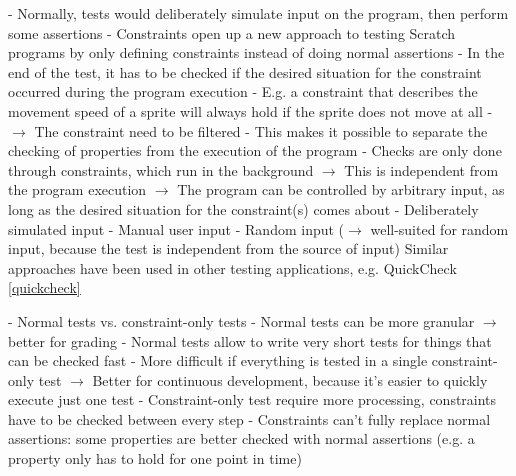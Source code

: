 - Normally, tests would deliberately simulate input on the program, then perform some assertions
- Constraints open up a new approach to testing Scratch programs by only defining constraints instead of doing normal assertions
- In the end of the test, it has to be checked if the desired situation for the constraint occurred during the program execution
    - E.g. a constraint that describes the movement speed of a sprite will always hold if the sprite does not move at all
    - $\rightarrow$ The constraint need to be filtered
- This makes it possible to separate the checking of properties from the execution of the program
    - Checks are only done through constraints, which run in the background
    $\rightarrow$ This is independent from the program execution
    $\rightarrow$ The program can be controlled by arbitrary input, as long as the desired situation for the constraint(s) comes about
        - Deliberately simulated input
        - Manual user input
        - Random input ($\rightarrow$ well-suited for random input, because the test is independent from the source of input)
          Similar approaches have been used in other testing applications, e.g. QuickCheck \ref{quickcheck}

- Normal tests vs. constraint-only tests
    - Normal tests can be more granular $\rightarrow$ better for grading
    - Normal tests allow to write very short tests for things that can be checked fast
        - More difficult if everything is tested in a single constraint-only test
        $\rightarrow$ Better for continuous development, because it's easier to quickly execute just one test
    - Constraint-only test require more processing, constraints have to be checked between every step
    - Constraints can't fully replace normal assertions: some properties are better checked with normal assertions (e.g. a property only has to hold for one point in time)

